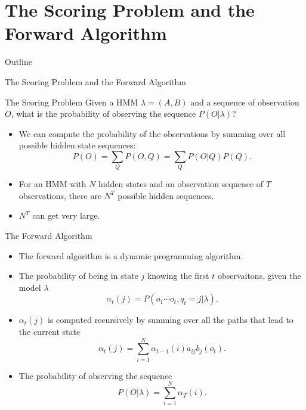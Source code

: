 \documentclass{beamer}
\begin{document}
\section{The Scoring Problem and the Forward Algorithm}
\begin{frame}{Outline}
	\tableofcontents[currentsection]
\end{frame}
\begin{frame}{The Scoring Problem and the Forward Algorithm}
	\begin{block}{The Scoring Problem}
		Given a HMM $\lambda = (A,B)$ and a sequence of observation $O$, what is the probability of observing the sequence $P(O \vert \lambda)$?
	\end{block}
	\begin{itemize}
		\item We can compute the probability of the observations by summing over all possible hidden state sequences:
		$$P(O) = \sum_Q P(O, Q) = \sum_Q P(O\vert Q) P(Q).$$
		\item For an HMM with $N$ hidden states and an observation sequence of $T$ observations, there are $N^T$ possible hidden sequences.
		\item $N^T$ can get very large.
	\end{itemize}
\end{frame}

\begin{frame}{The Forward Algorithm}
	\begin{itemize}
		\item The forward algorithm is a dynamic programming algorithm. 
		\item The probability of being in state $j$ knowing the first $t$ observaitons, given the model $\lambda$
		\begin{equation}
			\alpha_t(j) = P(o_1\cdots o_t, q_t = j \vert \lambda).
		\end{equation}
		\item $\alpha_t(j)$ is computed recursively by summing over all the paths that lead to the current state
		\begin{equation}
			\alpha_t(j) = \sum_{i=1}^N \alpha_{t-1}(i) a_{ij} b_j (o_t).
		\end{equation}
		\item The probability of observing the sequence
		\begin{equation}
			P(O \vert \lambda) = \sum_{i=1}^N \alpha_T(i).
		\end{equation}
	\end{itemize}
\end{frame}
\end{document}

